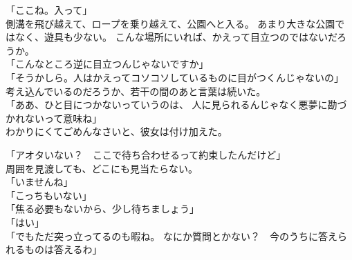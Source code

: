 \documentclass[../IHMain]{subfiles}
\begin{document}
「ここね。入って」\\
側溝を飛び越えて、ロープを乗り越えて、公園へと入る。
あまり大きな公園ではなく、遊具も少ない。
こんな場所にいれば、かえって目立つのではないだろうか。\\
「こんなところ逆に目立つんじゃないですか」\\
「そうかしら。人はかえってコソコソしているものに目がつくんじゃないの」\\
考え込んでいるのだろうか、若干の間のあと言葉は続いた。\\
「ああ、ひと目につかないっていうのは、
人に見られるんじゃなく悪夢に勘づかれないって意味ね」\\
わかりにくてごめんなさいと、彼女は付け加えた。

「アオタいない？　ここで待ち合わせるって約束したんだけど」\\
周囲を見渡しても、どこにも見当たらない。\\
「いませんね」\\
「こっちもいない」\\
「焦る必要もないから、少し待ちましょう」\\
「はい」\\
「でもただ突っ立ってるのも暇ね。
なにか質問とかない？　今のうちに答えられるものは答えるわ」\\
\end{document}
